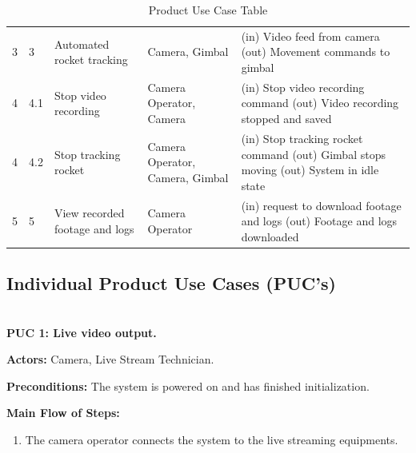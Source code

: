 \documentclass[12pt]{article}
\begin{document}
\begin{table}[H]
\begin{tabularx}{\textwidth}{p{0.4in}p{0.4in}p{1.25in}p{1in}X}
    3                               & 3                       & Automated rocket tracking      &
    Camera, Gimbal                  &
    (in) Video feed from camera \newline
    (out) Movement commands to gimbal                                                            \\
    4                               & 4.1                     & Stop video recording           &
    Camera Operator, Camera         &
    (in) Stop video recording command \newline
    (out) Video recording stopped and saved                                                      \\
    4                               & 4.2                     & Stop tracking rocket           &
    Camera Operator, Camera, Gimbal &
    (in) Stop tracking rocket command \newline
    (out) Gimbal stops moving \newline
    (out) System in idle state                                                                   \\
    5                               & 5                       & View recorded footage and logs &
    Camera Operator                 &
    (in) request to download footage and logs \newline
    (out) Footage and logs downloaded                                                            \\

    \bottomrule
  \end{tabularx}
  \caption{Product Use Case Table}
  \label{tab:product-use-case-table}
\end{table}

\subsection{Individual Product Use Cases (PUC's)}

~\\

\textbf{PUC 1: Live video output.}

\textbf{Actors:} Camera, Live Stream Technician.

\textbf{Preconditions:} The system is powered on and has finished initialization.

\textbf{Main Flow of Steps:}
\begin{enumerate}
  \item The camera operator connects the system to the live streaming equipments.
\end{enumerate}
\end{document}
